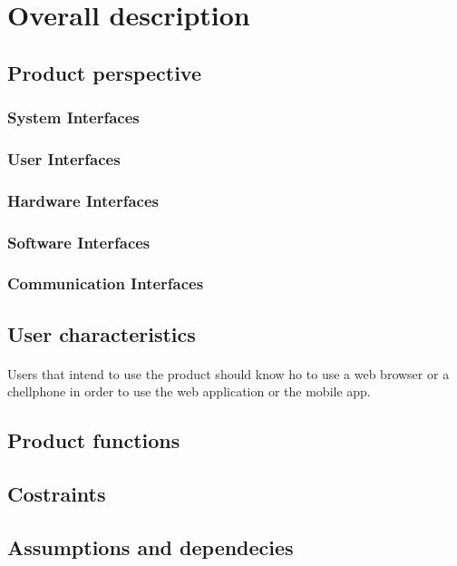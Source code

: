 \section{Overall description}
	\subsection{Product perspective}
		\subsubsection{System Interfaces}
		\subsubsection{User Interfaces}
		\subsubsection{Hardware Interfaces}
		\subsubsection{Software Interfaces}
		\subsubsection{Communication Interfaces}
	\subsection{User characteristics}
	\paragraph*{}Users that intend to use the product should know ho to use a web browser or a chellphone in order to use the web application or the mobile app.
	\subsection{Product functions}
	\subsection{Costraints}
	\subsection{Assumptions and dependecies}
	